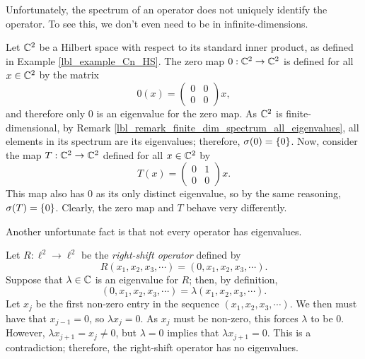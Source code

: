Unfortunately, the spectrum of an operator does not uniquely identify the operator. To see this, we don't even need to be in infinite-dimensions.
\begin{example}
  Let $\mathbb{C}^2$ be a Hilbert space with respect to its standard inner product, as defined in Example \eqref{lbl_example_Cn_HS}. The zero map $0: \mathbb{C}^2 \to \mathbb{C}^2$ is defined for all $x \in \mathbb{C}^2$ by the matrix
  \begin{equation*}
    0(x) = \begin{pmatrix}
              0 & 0 \\
              0 & 0
            \end{pmatrix}x,
  \end{equation*}
  and therefore only 0 is an eigenvalue for the zero map. As $\mathbb{C}^2$ is finite-dimensional, by Remark \eqref{lbl_remark_finite_dim_spectrum_all_eigenvalues}, all elements in its spectrum are its eigenvalues; therefore, $\sigma(0) = \left\{0\right\}$. Now, consider the map $T: \mathbb{C}^2 \to \mathbb{C}^2$ defined for all $x \in \mathbb{C}^2$ by
  \begin{equation*}
    T(x) = \begin{pmatrix}
              0 & 1 \\
              0 & 0
            \end{pmatrix}x.
  \end{equation*}
  This map also has $0$ as its only distinct eigenvalue, so by the same reasoning, $\sigma(T) = \left\{0\right\}$. Clearly, the zero map and $T$ behave very differently.
\end{example}

Another unfortunate fact is that not every operator has eigenvalues.

\begin{example}\label{lbl_example_right_shift_no_eigenvalues}
  Let $R: \ell^2 \to \ell^2$ be the {\emph{right-shift operator}} defined by
  \begin{equation*}
    R(x_1, x_2, x_3, \cdots) = (0, x_1, x_2, x_3, \cdots).
  \end{equation*}
  Suppose that $\lambda \in \mathbb{C}$ is an eigenvalue for $R$; then, by definition,
  \begin{equation*}
    (0, x_1, x_2, x_3, \cdots) = \lambda (x_1, x_2, x_3, \cdots).
  \end{equation*}
  Let $x_j$ be the first non-zero entry in the sequence $(x_1, x_2, x_3, \cdots)$. We then must have that $x_{j-1} = 0$, so $\lambda x_{j} = 0$. As $x_j$ must be non-zero, this forces $\lambda$ to be 0. However, $\lambda x_{j+1} = x_j \neq 0$, but $\lambda = 0$ implies that $\lambda x_{j+1} = 0$. This is a contradiction; therefore, the right-shift operator has no eigenvalues.
\end{example}

